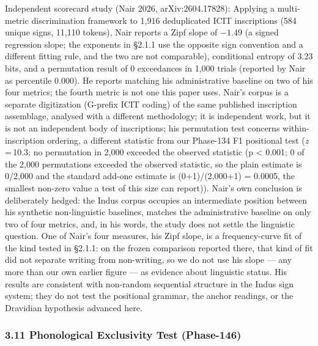 \documentclass[
]{article}
\begin{document}
Independent scorecard study (Nair 2026, arXiv:2604.17828): Applying a
multi-metric discrimination framework to 1,916 deduplicated ICIT
inscriptions (584 unique signs, 11,110 tokens), Nair reports a Zipf slope of $-1.49$ (a signed regression slope; the exponents in §2.1.1 use the opposite sign convention and a different fitting rule, and the two are not comparable), conditional entropy of 3.23 bits, and a permutation result of 0 exceedances in 1,000 trials (reported by Nair as percentile 0.000). He reports matching his administrative baseline on two of his four metrics; the fourth metric is not one this paper uses. Nair's corpus is a separate digitization (G-prefix ICIT coding) of the same published inscription assemblage, analysed with a different methodology; it is independent work, but it is not an independent body of inscriptions; his permutation
test concerns within-inscription ordering, a different statistic from
our Phase-134 F1 positional test (\textit{z}\,=\,10.3; no permutation in 2,000 exceeded the observed statistic (p \textless{} 0.001; 0 of the 2,000 permutations exceeded the observed statistic, so the plain estimate is 0/2,000 and the standard add-one estimate is (0+1)/(2,000+1) = 0.0005, the smallest non-zero value a test of this size can report)). Nair's own conclusion is
deliberately hedged: the Indus corpus occupies an intermediate
position between his synthetic non-linguistic baselines, matches the
administrative baseline on only two of four metrics, and, in his
words, the study does not settle the linguistic question. One of Nair's four measures, his Zipf slope, is a frequency-curve fit of the kind tested in §2.1.1: on the frozen comparison reported there, that kind of fit did not separate writing from non-writing, so we do not use his slope --- any more than our own earlier figure --- as evidence about linguistic status. His results are consistent with non-random sequential structure in the Indus sign system; they do not test the positional grammar, the anchor readings, or the Dravidian hypothesis advanced here.

\subsubsection{3.11 Phonological Exclusivity Test
(Phase-146)}\label{phonological-exclusivity-test-phase-146}
\end{document}
